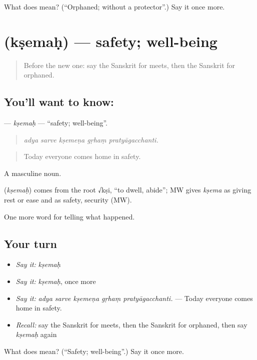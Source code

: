 \begin{tcolorbox}[breakable,colback=teal!4,colframe=teal!35!black,title={Before you move on}]
What does  mean? (\textquotedblleft{}Orphaned; without a protector\textquotedblright{}.) Say it once more.
\end{tcolorbox}
\section[\texorpdfstring{\sk{क्षेमः} (kṣemaḥ)}{क्षेमः (kṣemaḥ)}]{ (kṣemaḥ) — safety; well-being}

\label{lesson:SA-C307-ksemah}



\begin{quote}
Before the new one: say the Sanskrit for meets, then the Sanskrit for orphaned.
\end{quote}

\subsection*{You'll want to know: }
\textbf{} — \emph{kṣemaḥ} — \textquotedblleft{}safety; well-being\textquotedblright{}.

\begin{quote}
    
\end{quote}

\begin{quote}
\emph{adya sarve kṣemeṇa gṛhaṃ pratyāgacchanti.}
\end{quote}

\begin{quote}
Today everyone comes home in safety.
\end{quote}

A masculine noun.

\begin{cousinweb}
\textbf{} (\emph{kṣemaḥ}) comes from the root √kṣi, \textquotedblleft{}to dwell, abide\textquotedblright{}; MW gives \emph{kṣema} as giving rest or ease and as safety, security (MW).
\end{cousinweb}

\begin{grammarlens}[title={What you've built}]
One more word for telling what happened.
\end{grammarlens}

\subsection*{Your turn}
\begin{itemize}
\raggedright
  \item \emph{Say it:} \emph{kṣemaḥ}
  \item \emph{Say it:} \emph{kṣemaḥ}, once more
  \item \emph{Say it:} \emph{adya sarve kṣemeṇa gṛhaṃ pratyāgacchanti.} — Today everyone comes home in safety.
  \item \emph{Recall:} say the Sanskrit for meets, then the Sanskrit for orphaned, then say \emph{kṣemaḥ} again
\end{itemize}

\begin{tcolorbox}[breakable,colback=teal!4,colframe=teal!35!black,title={Before you move on}]
What does  mean? (\textquotedblleft{}Safety; well-being\textquotedblright{}.) Say it once more.
\end{tcolorbox}
